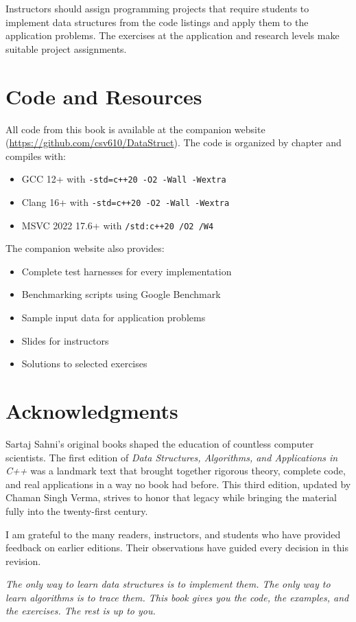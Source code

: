 Instructors should assign programming projects that require students to implement data structures from the code listings and apply them to the application problems. The exercises at the application and research levels make suitable project assignments.

\section{Code and Resources}

All code from this book is available at the companion website (\url{https://github.com/csv610/DataStruct}). The code is organized by chapter and compiles with:

\begin{itemize}
\item GCC 12+ with \texttt{-std=c++20 -O2 -Wall -Wextra}
\item Clang 16+ with \texttt{-std=c++20 -O2 -Wall -Wextra}
\item MSVC 2022 17.6+ with \texttt{/std:c++20 /O2 /W4}
\end{itemize}

The companion website also provides:
\begin{itemize}
\item Complete test harnesses for every implementation
\item Benchmarking scripts using Google Benchmark
\item Sample input data for application problems
\item Slides for instructors
\item Solutions to selected exercises
\end{itemize}

\section{Acknowledgments}

Sartaj Sahni's original books shaped the education of countless computer scientists. The first edition of \textit{Data Structures, Algorithms, and Applications in C++} was a landmark text that brought together rigorous theory, complete code, and real applications in a way no book had before. This third edition, updated by Chaman Singh Verma, strives to honor that legacy while bringing the material fully into the twenty-first century.

I am grateful to the many readers, instructors, and students who have provided feedback on earlier editions. Their observations have guided every decision in this revision.

\bigskip

\textit{The only way to learn data structures is to implement them. The only way to learn algorithms is to trace them. This book gives you the code, the examples, and the exercises. The rest is up to you.}

